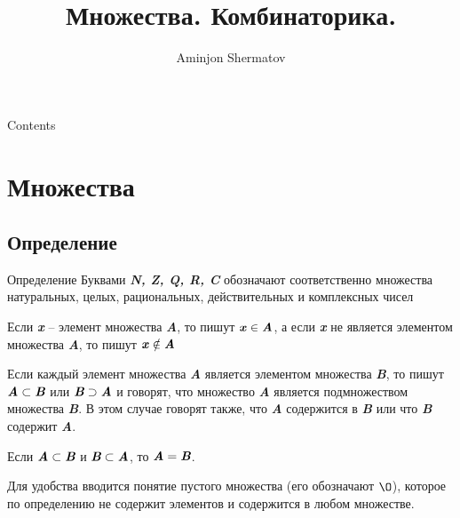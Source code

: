 \documentclass{beamer}
\begin{document}
    \onehalfspacing
    \setlength{\parskip}{\baselineskip}%
    \setlength{\parindent}{0.8pt}%

    \title{Множества. Комбинаторика.}
    \author{Aminjon Shermatov}

    \begin{frame}
        \titlepage
    \end{frame}

    \begin{frame}{Contents}
        \doublespacing
        \tableofcontents
        \singlespacing
    \end{frame}

    \section{Множества}

    \subsection{Определение}
    \begin{frame}{Определение}
        \fontsize{10}{8}\selectfont Буквами \textit{\textbf{N, Z, Q, R, C}} обозначают соответственно множества натуральных, целых, рациональных, действительных и комплексных чисел

        Если \textit{\textbf{x}} -- элемент множества \textit{\textbf{A}}, то пишут $\textbf{\textit{x}} \in \textbf{\textit{A}}$, а если \textit{\textbf{x}} не является элементом множества \textit{\textbf{A}}, то пишут $\textbf{\textit{x}} \notin \textbf{\textit{A}}$

        Если каждый элемент множества \textit{\textbf{A}} является элементом множества \textit{\textbf{B}}, то пишут $\textit{\textbf{A}} \subset \textit{\textbf{B}}$ или $\textit{\textbf{B}} \supset \textit{\textbf{A}}$ и говорят, что множество \textit{\textbf{A}} является подмножеством множества \textit{\textbf{B}}. В этом случае говорят также, что \textit{\textbf{A}} содержится в \textit{\textbf{B}} или что \textit{\textbf{B}} содержит \textit{\textbf{A}}.

        Если $\textit{\textbf{A}} \subset \textit{\textbf{B}}$ и $\textit{\textbf{B}} \subset \textit{\textbf{A}}$, то $\textit{\textbf{A}} = \textit{\textbf{B}}$.

        Для удобства вводится понятие пустого множества (его обозначают $\O$), которое по определению не содержит элементов и содержится в любом множестве.
    \end{frame}
\end{document}
